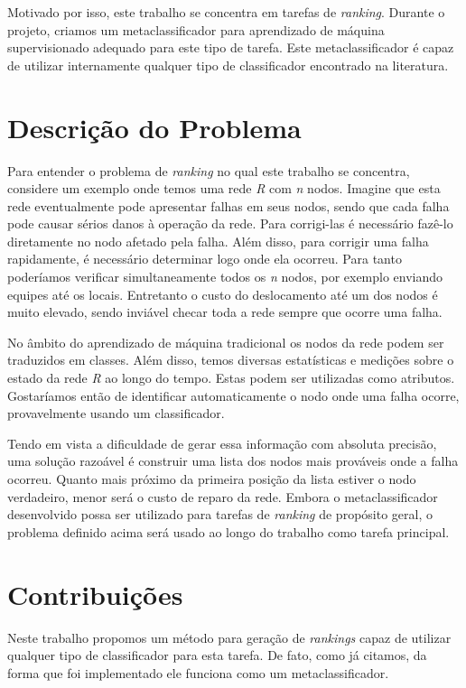 Motivado por isso, este trabalho se concentra em tarefas de \textit{ranking}.
Durante o projeto, criamos um metaclassificador para aprendizado de máquina supervisionado adequado para este tipo de tarefa.
Este metaclassificador é capaz de utilizar internamente qualquer tipo de classificador encontrado na literatura.

\section{Descrição do Problema}

Para entender o problema de \textit{ranking} no qual este trabalho se concentra, considere um exemplo onde temos uma rede \textit{R} com \textit{n} nodos.
Imagine que esta rede eventualmente pode apresentar falhas em seus nodos, sendo que cada falha pode causar sérios danos à operação da rede.
Para corrigi-las é necessário fazê-lo diretamente no nodo afetado pela falha.
Além disso, para corrigir uma falha rapidamente, é necessário determinar logo onde ela ocorreu.
Para tanto poderíamos verificar simultaneamente todos os \textit{n} nodos, por exemplo enviando equipes até os locais.
Entretanto o custo do deslocamento até um dos nodos é muito elevado, sendo inviável checar toda a rede sempre que ocorre uma falha.

No âmbito do aprendizado de máquina tradicional os nodos da rede podem ser traduzidos em classes.
Além disso, temos diversas estatísticas e medições sobre o estado da rede \textit{R} ao longo do tempo.
Estas podem ser utilizadas como atributos.
Gostaríamos então de identificar automaticamente o nodo onde uma falha ocorre, provavelmente usando um classificador.

Tendo em vista a dificuldade de gerar essa informação com absoluta precisão, uma solução razoável é construir uma lista dos nodos mais prováveis onde a falha ocorreu.
Quanto mais próximo da primeira posição da lista estiver o nodo verdadeiro, menor será o custo de reparo da rede.
Embora o metaclassificador desenvolvido possa ser utilizado para tarefas de \textit{ranking} de propósito geral, o problema definido acima será usado ao longo do trabalho como tarefa principal.

\newpage
\section{Contribuições}

Neste trabalho propomos um método para geração de \textit{rankings} capaz de utilizar qualquer tipo de classificador para esta tarefa.
De fato, como já citamos, da forma que foi implementado ele funciona como um metaclassificador.

